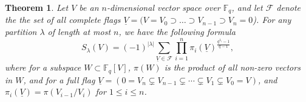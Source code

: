 \documentclass[10pt,a4paper]{amsart}
\newtheorem{theorem}{Theorem}
\begin{document}
\begin{theorem}\label{main_rewrite}
Let $V$ be an $n$-dimensional vector space over $\mathbb{F}_q$, and let $\mathcal{F}$ denote the the set of all complete flags $\underline{V} = (V=V_0 \supset \ldots \supset V_{n-1} \supset V_n = 0$). For any partition $\lambda$ of length at most $n$, we have the following formula
\begin{equation*}  
    S_\lambda(V) = (-1)^{|\lambda|} \sum\limits_{\underline{V} \in \mathcal{F}}\prod\limits_{i=1}^{n} \pi_i (\underline{V})^{\frac{q^{\lambda_{i}}-1}{q-1}},
\end{equation*}
where for a subspace $W \subset \mathbb{F}_q[V]$, $\pi(W)$ is the product of all non-zero vectors in $W$, and for a full flag $\underline{V} = (0 = V_n \subsetneq V_{n-1}\subsetneq \cdots \subsetneq V_1\subsetneq V_0 = V)$, and $\pi_i(\underline{V}) = \pi(V_{i-1}/V_i)$ for $1 \leq i \leq n$.
\end{theorem}
\end{document}
